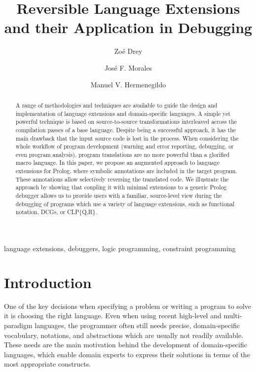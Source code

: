 \documentclass[preprint]{llncs}
\begin{document}
\title{Reversible Language Extensions and their Application in Debugging}

\author{Zo\'e Drey \and Jos\'e F. Morales \and Manuel V. Hermenegildo
}
\maketitle



\begin{abstract}
  A range of methodologies and techniques are available to guide the
  design and implementation of language extensions and domain-specific
  languages.
A simple yet powerful technique is based on source-to-source
  transformations interleaved across the compilation passes of a base
  language. Despite being a successful approach, it has the main
  drawback that the input source code is lost in the process.
When considering the whole workflow of program development (warning
  and error reporting, debugging, or even program analysis), program
  translations are no more powerful than a glorified macro language.
In this paper, we propose an augmented approach to language
  extensions for Prolog, where symbolic annotations are included in
  the target program. These annotations allow selectively
  reversing the translated code.
We illustrate the approach by showing that coupling it with minimal
  extensions to a generic Prolog debugger allows us to provide users
  with a familiar, source-level view during the debugging of programs
  which use a variety of language extensions, such as functional
  notation, DCGs, or CLP\{Q,R\}.
\end{abstract}



\keywords
language extensions, debuggers, logic programming, constraint programming



\section{Introduction}
\label{sec:introduction}

One of the key decisions when specifying a problem or writing a
program to solve it is choosing the right language. Even when using
recent high-level and multi-paradigm languages, the programmer often
still needs precise, domain-specific vocabulary, notations, and
abstractions which are usually not readily available.
These needs are the main motivation behind the development of
domain-specific languages, which enable domain experts to express
their solutions in terms of the most appropriate constructs.
\end{document}
